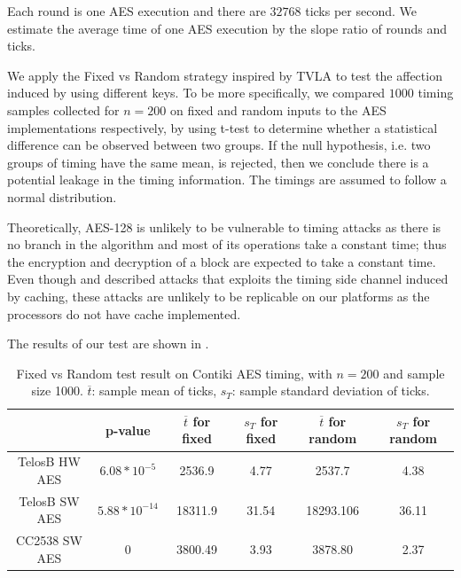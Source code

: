 Each round is one AES execution and there are $32768$ ticks per second. We estimate the average time of one AES execution by the slope ratio of rounds and ticks.

We apply the Fixed vs Random strategy inspired by TVLA\cite{TVLA} to test the affection induced by using different keys. To be more specifically, we compared $1000$ timing samples collected for $n=200$ on fixed and random inputs to the AES implementations respectively, by using t-test to determine whether a statistical difference can be observed  between two groups. If the null hypothesis, i.e. two groups of timing have the same mean, is rejected, then we conclude there is a potential leakage in the timing information. The timings are assumed to follow a normal distribution.

Theoretically, AES-128 is unlikely to be vulnerable to timing attacks as there is no branch in the algorithm and most of its operations take a constant time; thus the encryption and decryption of a block are expected to take a constant time. Even though \cite{Cache-Timing1} and \cite{Cache-Timing2} described attacks that exploits the timing side channel induced by caching, these attacks are unlikely to be replicable on our platforms as the processors do not have cache implemented. 

The results of our test are shown in .

\begin{table}[ht!]
	\centering
	\begin{tabular}{|c|c|c|c|c|c|}
		\hline
		              & p-value           & $\overline{t}$ for fixed & $s_{T}$ for fixed & $\overline{t}$ for random & $s_{T}$ for random\\ \hline
		TelosB HW AES & $6.08 * 10^{-5}$  & 2536.9     & 4.77      & 2537.7      & 4.38       \\ \hline
		TelosB SW AES & $5.88 * 10^{-14}$ & 18311.9    & 31.54     & 18293.106   & 36.11      \\ \hline
		CC2538 SW AES & 0                 & 3800.49    & 3.93      & 3878.80     & 2.37       \\ \hline
	\end{tabular}
	\caption{Fixed vs Random test result on Contiki AES timing, with $n=200$ and sample size 1000. $\overline{t}$: sample mean of ticks, $s_{T}$: sample standard deviation of ticks.}
	\label{Tbl: Fixed vs Random test on Contiki AES timing}
\end{table}

